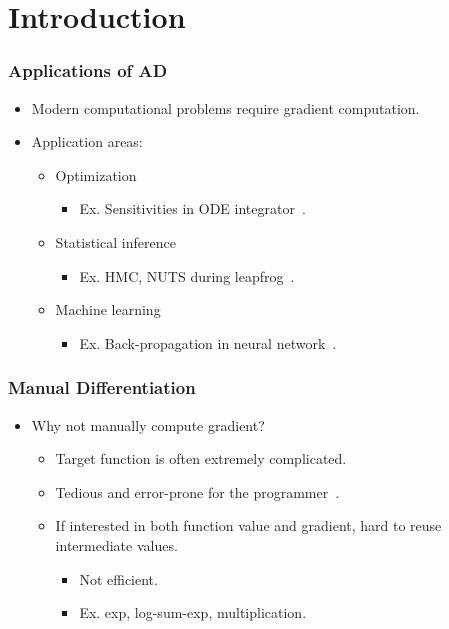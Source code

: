 \section{Introduction}
\frame{\tableofcontents[currentsection]}

\begin{frame}
\frametitle{Applications of AD}
\begin{itemize}
\item Modern computational problems require gradient computation.
\item Application areas:
    \begin{itemize}
        \item Optimization
            \begin{itemize}
                \item Ex. Sensitivities in ODE integrator~\cite{carpenter:2015}.
            \end{itemize}
        \item Statistical inference
            \begin{itemize}
                \item Ex. HMC, NUTS during leapfrog~\cite{hoffman:2011}\cite{neal:2012}.
            \end{itemize}
        \item Machine learning
            \begin{itemize}
                \item Ex. Back-propagation in neural network~\cite{goodfellow:2016}.
            \end{itemize}
    \end{itemize}
\end{itemize}
\end{frame}

\begin{frame}
\frametitle{Manual Differentiation}
\begin{itemize}
\item Why not manually compute gradient?
    \begin{itemize}
        \item Target function is often extremely complicated.
        \item Tedious and error-prone for the programmer~\cite{margossian:2018}.
        \item If interested in both function value and gradient, hard to reuse intermediate values.
            \begin{itemize}
                \item Not efficient.
                \item Ex. exp, log-sum-exp, multiplication.
            \end{itemize}
    \end{itemize}
\end{itemize}
\end{frame}

